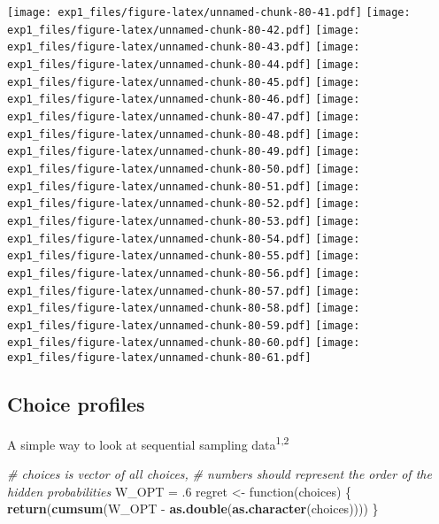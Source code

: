 \documentclass[11pt,,]{article}
\newenvironment{Shaded}{\begin{snugshade}}{\end{snugshade}}
\newcommand{\KeywordTok}[1]{\textcolor[rgb]{0.13,0.29,0.53}{\textbf{{#1}}}}
\newcommand{\DecValTok}[1]{\textcolor[rgb]{0.00,0.00,0.81}{{#1}}}
\newcommand{\StringTok}[1]{\textcolor[rgb]{0.31,0.60,0.02}{{#1}}}
\newcommand{\CommentTok}[1]{\textcolor[rgb]{0.56,0.35,0.01}{\textit{{#1}}}}
\newcommand{\NormalTok}[1]{{#1}}
\newcommand*\cleartoleftpage{%
  \clearpage
  \ifodd\value{page}\hbox{}\newpage\fi
}
\begin{document}
\texttt{[image: exp1\_files/figure-latex/unnamed-chunk-80-41.pdf]}
\texttt{[image: exp1\_files/figure-latex/unnamed-chunk-80-42.pdf]}
\texttt{[image: exp1\_files/figure-latex/unnamed-chunk-80-43.pdf]}
\texttt{[image: exp1\_files/figure-latex/unnamed-chunk-80-44.pdf]}
\texttt{[image: exp1\_files/figure-latex/unnamed-chunk-80-45.pdf]}
\texttt{[image: exp1\_files/figure-latex/unnamed-chunk-80-46.pdf]}
\texttt{[image: exp1\_files/figure-latex/unnamed-chunk-80-47.pdf]}
\texttt{[image: exp1\_files/figure-latex/unnamed-chunk-80-48.pdf]}
\texttt{[image: exp1\_files/figure-latex/unnamed-chunk-80-49.pdf]}
\texttt{[image: exp1\_files/figure-latex/unnamed-chunk-80-50.pdf]}
\texttt{[image: exp1\_files/figure-latex/unnamed-chunk-80-51.pdf]}
\texttt{[image: exp1\_files/figure-latex/unnamed-chunk-80-52.pdf]}
\texttt{[image: exp1\_files/figure-latex/unnamed-chunk-80-53.pdf]}
\texttt{[image: exp1\_files/figure-latex/unnamed-chunk-80-54.pdf]}
\texttt{[image: exp1\_files/figure-latex/unnamed-chunk-80-55.pdf]}
\texttt{[image: exp1\_files/figure-latex/unnamed-chunk-80-56.pdf]}
\texttt{[image: exp1\_files/figure-latex/unnamed-chunk-80-57.pdf]}
\texttt{[image: exp1\_files/figure-latex/unnamed-chunk-80-58.pdf]}
\texttt{[image: exp1\_files/figure-latex/unnamed-chunk-80-59.pdf]}
\texttt{[image: exp1\_files/figure-latex/unnamed-chunk-80-60.pdf]}
\texttt{[image: exp1\_files/figure-latex/unnamed-chunk-80-61.pdf]}

\cleartoleftpage

\subsection{Choice profiles}\label{choice-profiles}

A simple way to look at sequential sampling data\textsuperscript{1,2}

\begin{Shaded}
\begin{Highlighting}[]
\CommentTok{# choices is vector of all choices, }
\CommentTok{# numbers should represent the order of the hidden probabilities}
\NormalTok{W_OPT =}\StringTok{ }\NormalTok{.}\DecValTok{6}
\NormalTok{regret <-}\StringTok{ }\NormalTok{function(choices) \{ }
    \KeywordTok{return}\NormalTok{(}\KeywordTok{cumsum}\NormalTok{(W_OPT -}\StringTok{ }\KeywordTok{as.double}\NormalTok{(}\KeywordTok{as.character}\NormalTok{(choices))))}
\NormalTok{\}}
\end{Highlighting}
\end{Shaded}
\end{document}
